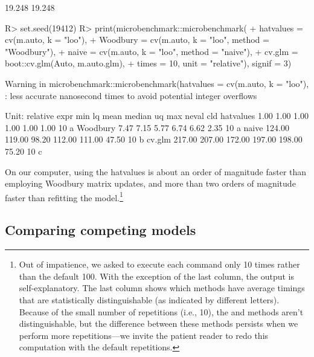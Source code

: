 \documentclass[
]{jss}
\begin{document}
\begin{CodeChunk}
\begin{CodeOutput}
[1] 19.248 19.248
\end{CodeOutput}
\begin{CodeInput}
R> set.seed(19412)
R> print(microbenchmark::microbenchmark(
+   hatvalues = cv(m.auto, k = "loo"),
+   Woodbury = cv(m.auto, k = "loo", method = "Woodbury"),
+   naive = cv(m.auto, k = "loo", method = "naive"),
+   cv.glm = boot::cv.glm(Auto, m.auto.glm),
+   times = 10, unit = "relative"), signif = 3)
\end{CodeInput}
\begin{CodeOutput}
Warning in microbenchmark::microbenchmark(hatvalues = cv(m.auto, k = "loo"), :
less accurate nanosecond times to avoid potential integer overflows
\end{CodeOutput}
\begin{CodeOutput}
Unit: relative
      expr    min     lq   mean median     uq   max neval cld
 hatvalues   1.00   1.00   1.00   1.00   1.00  1.00    10 a
  Woodbury   7.47   7.15   5.77   6.74   6.62  2.35    10 a
     naive 124.00 119.00  98.20 112.00 111.00 47.50    10  b
    cv.glm 217.00 207.00 172.00 197.00 198.00 75.20    10   c
\end{CodeOutput}
\end{CodeChunk}

On our computer, using the hatvalues is about an order of magnitude
faster than employing Woodbury matrix updates, and more than two orders
of magnitude faster than refitting the model.\footnote{Out of
  impatience, we asked  to execute each command
  only 10 times rather than the default 100. With the exception of the
  last column, the output is self-explanatory. The last column shows
  which methods have average timings that are statistically
  distinguishable (as indicated by different letters). Because of the
  small number of repetitions (i.e., 10), the  and
   methods aren't distinguishable, but the difference
  between these methods persists when we perform more repetitions---we
  invite the patient reader to redo this computation with the default
   repetitions.}

\subsection{Comparing competing
models}\label{comparing-competing-models}
\end{document}
